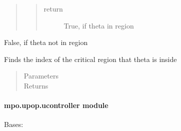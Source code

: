 \documentclass[letterpaper,10pt,english]{sphinxmanual}
\begin{document}
\begin{fulllineitems}
\begin{fulllineitems}
\begin{quote}
\begin{quote}
\begin{description}
\item[{return}] \leavevmode
\sphinxAtStartPar
True, if theta in region

\end{description}\end{quote}
\end{quote}

\sphinxAtStartPar
False, if theta not in region

\end{fulllineitems}


\begin{fulllineitems}
\label{\detokenize{mpo.upop:mpo.upop.point_location.PointLocation.locate}}
\sphinxAtStartPar
Finds the index of the critical region that theta is inside
\begin{quote}\begin{description}
\item[{Parameters}] \leavevmode
\sphinxAtStartPar
{} \textendash{} 

\item[{Returns}] \leavevmode
\sphinxAtStartPar


\end{description}\end{quote}

\end{fulllineitems}


\end{fulllineitems}



\paragraph{mpo.upop.ucontroller module}
\label{\detokenize{mpo.upop:module-mpo.upop.ucontroller}}\label{\detokenize{mpo.upop:mpo-upop-ucontroller-module}}

\begin{fulllineitems}
\label{\detokenize{mpo.upop:mpo.upop.ucontroller.BVH}}
\sphinxAtStartPar
Bases: 

\end{fulllineitems}
\end{document}
